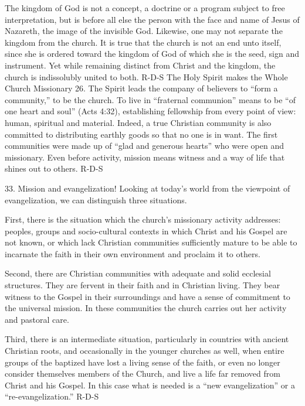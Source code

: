 \documentclass[oneside]{book}
\begin{document}
The kingdom of God is not a concept, a doctrine or a program subject to free
interpretation, but is before all else the person with the face and name of
Jesus of Nazareth, the image of the invisible God. Likewise, one may not
separate the kingdom from the church. It is true that the church is not an end
unto itself, since she is ordered toward the kingdom of God of which she is the
seed, sign and instrument. Yet while remaining distinct from Christ and the
kingdom, the church is indissolubly united to both.
R-D-S
The Holy Spirit makes the Whole Church Missionary
26. The Spirit leads the company of believers to ``form a community,'' to be the
church. To live in ``fraternal communion'' means to be ``of one heart and soul''
(Acts 4:32), establishing fellowship from every point of view: human, spiritual
and material. Indeed, a true Christian community is also committed to
distributing earthly goods so that no one is in want. The first communities were
made up of ``glad and generous hearts'' who were open and missionary. Even
before activity, mission means witness and a way of life that shines out to
others.
R-D-S

33. Mission and evangelization! Looking at today's world from the viewpoint of
evangelization, we can distinguish three situations.

First, there is the situation which the church's missionary activity addresses:
peoples, groups and socio-cultural contexts in which Christ and his Gospel are
not known, or which lack Christian communities sufficiently mature to be able to
incarnate the faith in their own environment and proclaim it to others.

Second, there are Christian communities with adequate and solid ecclesial
structures. They are fervent in their faith and in Christian living. They bear
witness to the Gospel in their surroundings and have a sense of commitment to
the universal mission. In these communities the church carries out her activity
and pastoral care.

Third, there is an intermediate situation, particularly in countries with
ancient Christian roots, and occasionally in the younger churches as well, when
entire groups of the baptized have lost a living sense of the faith, or even no
longer consider themselves members of the Church, and live a life far removed
from Christ and his Gospel. In this case what is needed is a ``new
evangelization'' or a ``re-evangelization.''
R-D-S

\end{document}
